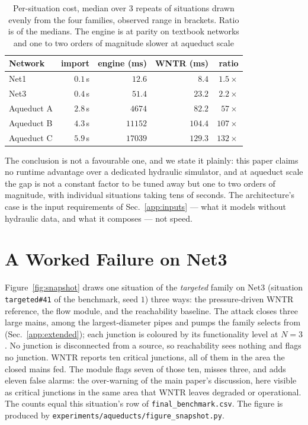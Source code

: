 \documentclass[11pt]{article}
\begin{document}
\begin{table}[h]
\centering
\caption{Per-situation cost, median over $3$ repeats of situations drawn evenly
from the four families, observed range in brackets. Ratio is of the medians. The
engine is at parity on textbook networks and one to two orders of magnitude
slower at aqueduct scale}\label{tab:cost}
\small
\begin{tabular}{@{}lrrrr@{}}
\toprule
Network & import & engine (ms) & WNTR (ms) & ratio\\
\midrule
Net1       & $0.1$\,s & $12.6$ \; [$1.9$--$100$]        & $8.4$   & $1.5\times$\\
Net3       & $0.4$\,s & $51.4$ \; [$41$--$4907$]        & $23.2$  & $2.2\times$\\
Aqueduct A & $2.8$\,s & $4674$ \; [$3880$--$9674$]      & $82.2$  & $57\times$\\
Aqueduct B & $4.3$\,s & $11152$ \; [$589$--$13687$]     & $104.4$ & $107\times$\\
Aqueduct C & $5.9$\,s & $17039$ \; [$4083$--$25283$]    & $129.3$ & $132\times$\\
\bottomrule
\end{tabular}
\end{table}

The conclusion is not a favourable one, and we state it plainly: this paper
claims no runtime advantage over a dedicated hydraulic simulator, and at aqueduct
scale the gap is not a constant factor to be tuned away but one to two orders of
magnitude, with individual situations taking tens of seconds. 
The architecture's case is the input requirements of
Sec.~\ref{app:inputs} --- what it models without hydraulic data, and what it
composes --- not speed. 

\section{A Worked Failure on Net3}\label{app:snapshot}

Figure~\ref{fig:snapshot} draws one situation of the \emph{targeted} family on Net3
(situation \texttt{targeted\#41} of the benchmark, seed $1$) three ways: the
pressure-driven WNTR reference, the flow module, and the reachability baseline. The attack
closes three large mains, among the largest-diameter pipes and pumps the family selects from
(Sec.~\ref{app:extended}); each junction is coloured by its functionality level at $N=3$.
No junction is disconnected from a source, so reachability sees nothing and flags no junction.
WNTR reports ten critical junctions, all of them in the area the closed mains fed. The module flags seven of those ten, misses three, and adds eleven
false alarms: the over-warning of the main paper's discussion, here visible as
critical junctions in the same area that WNTR leaves degraded or operational. The counts equal
this situation's row of \texttt{final\_benchmark.csv}. The figure is produced by
\texttt{experiments/aqueducts/figure\_snapshot.py}.
\end{document}
